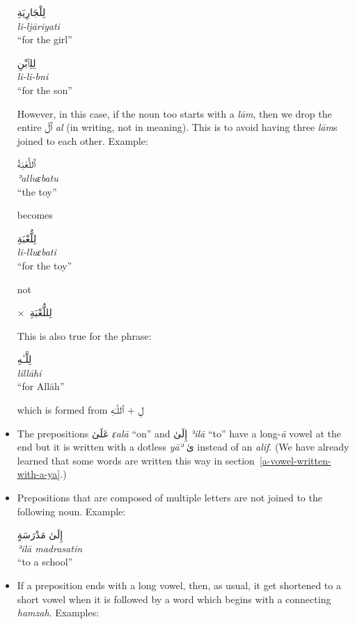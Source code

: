 \documentclass[
  10pt,
]{book}
\begin{document}
\begin{itemize}
  \foreignlanguage{arabic}{لِلْجَارِيَةِ}\\
  \emph{li-ljāriyati}\\
  \enquote{for the girl}

  \foreignlanguage{arabic}{لِلِٱبْنِ}\\
  \emph{li-li-bni}\\
  \enquote{for the son}

  However, in this case, if the noun too starts with a \emph{lām}, then we drop the entire \foreignlanguage{arabic}{ٱَلْ} \emph{al} (in writing, not in meaning). This is to avoid having three \emph{lām}s joined to each other. Example:

  \foreignlanguage{arabic}{ٱَللُّعْبَةُ}\\
  \emph{ʾalluɛbatu}\\
  \enquote{the toy}

  becomes

  \foreignlanguage{arabic}{لِلُّعْبَةِ}\\
  \emph{li-lluɛbati}\\
  \enquote{for the toy}

  not

  \(\times\)~\foreignlanguage{arabic}{لِللُّعْبَةِ}

  This is also true for the phrase:

  \foreignlanguage{arabic}{لِلَّـٰهِ}\\
  \emph{lillāhi}\\
  \enquote{for Allāh}

  which is formed from \foreignlanguage{arabic}{لِ + ٱللَّـٰهِ}
\item
  The prepositions
  \foreignlanguage{arabic}{عَلَىٰ} \emph{ɛalā} \enquote{on} and
  \foreignlanguage{arabic}{إِلَىٰ} \emph{ʾilā} \enquote{to} have a long-\emph{ā} vowel at the end but it is written with a dotless \emph{yāʾ} \foreignlanguage{arabic}{ىٰ} instead of an \emph{alif}. (We have already learned that some words are written this way in section~\ref{a-vowel-written-with-a-ya}.)
\item
  Prepositions that are composed of multiple letters are not joined to the following noun. Example:

  \foreignlanguage{arabic}{إِلَىٰ مَدْرَسَةٍ}\\
  \emph{ʾilā madrasatin}\\
  \enquote{to a school}
\item
  If a preposition ends with a long vowel, then, as usual, it get shortened to a short vowel when it is followed by a word which begins with a connecting \emph{hamzah}. Examples:


\end{itemize}
\end{document}
